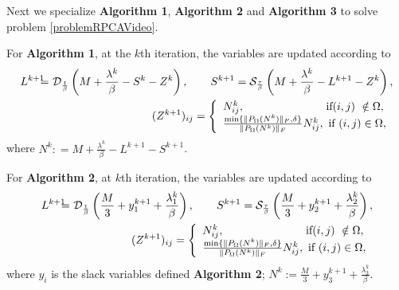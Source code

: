 \documentclass{mcom-l}
\theoremstyle{definition}
\theoremstyle{remark}
\numberwithin{equation}{section}
\begin{document}
Next we specialize {\bf{Algorithm 1}}, {\bf{Algorithm 2}} and {\bf{Algorithm 3}} to solve problem \eqref{problemRPCAVideo}.

For {\bf{Algorithm 1}}, at the $k$th iteration, the variables are updated according to
\begin{eqnarray}\label{subAlg1RPCA}
L^{k+1} \!\!\!\!&=&\!\!\!\! {\mathcal{D}}_{\frac{1}{\beta}}\left( M + \frac{\lambda^k}{\beta} - S^k - Z^k \right),\qquad S^{k+1} = {\mathcal{S}}_{\frac{\tau}{\beta}}\left( M + \frac{\lambda^k}{\beta} - L^{k+1} - Z^k \right),\nonumber\\
&& (Z^{k+1})_{ij}= \left\{\begin{array}{l}
                        N^k_{ij},\qquad\qquad\qquad\quad\  \hbox{if} (i,j)\ \notin\Omega,\\
                        \frac{\min\{\|P_{\Omega}(N^k)\|_F,\delta\}}{\|P_{\Omega}(N^k)\|_F} N_{ij}^k,\ \hbox{if}\  (i,j)\in \Omega, \\
                        \end{array}\right.\nonumber
\end{eqnarray}
where $N^k: = M + \frac{\lambda^k}{\beta} - L^{k+1} - S^{k+1}$.

For {\bf{Algorithm 2}}, at $k$th iteration, the variables are updated according to
\begin{eqnarray}\label{subAlg2RPCA}
L^{k+1} \!\!\!\!&=&\!\!\!\! {\mathcal{D}}_{\frac{1}{\beta}}\left( \frac{M}{3} + y_1^{k+1} + \frac{\lambda_1^k}{\beta} \right),\qquad S^{k+1} = {\mathcal{S}}_{\frac{\tau}{\beta}}\left( \frac{M}{3} + y_2^{k+1} + \frac{\lambda_2^k}{\beta} \right),\nonumber\\
&&(Z^{k+1})_{ij}= \left\{\begin{array}{l}
                        N^k_{ij},\qquad\qquad\qquad\quad\  \hbox{if} (i,j)\ \notin\Omega,\\
                        \frac{\min\{\|P_{\Omega}(N^k)\|_F,\delta\}}{\|P_{\Omega}(N^k)\|_F} N_{ij}^k,\ \hbox{if}\  (i,j)\in \Omega, \\
                        \end{array}\right.\nonumber
\end{eqnarray}
where $y_i$ is the slack variables defined {\bf{Algorithm 2}}; $N^k := \frac{M}{3} + y_3^{k+1} + \frac{\lambda_3^k}{\beta}$.
\end{document}

